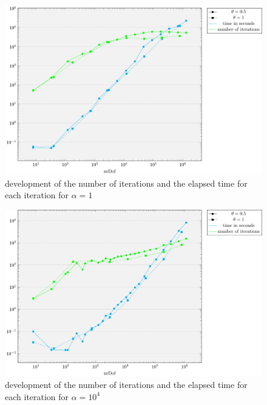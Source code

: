 \documentclass[draft=false,twoside,12pt]{scrreprt}
\begin{document}
\vspace{-\parskip}
\begin{figure}[H]
	\centering
	\includegraphics[width=14cm]{tikzPlots/f01/alpha1/misc.pdf}
  \caption{development of the number of iterations and the elapsed time for 
  each iteration for $\alpha=1$}
\end{figure}

\vspace{-\parskip}
\begin{figure}[H]
	\centering
	\includegraphics[width=14cm]{tikzPlots/f01/alpha1e4/misc.pdf}
  \caption{development of the number of iterations and the elapsed time for 
  each iteration for $\alpha=10^4$}
\end{figure}

\end{document}
